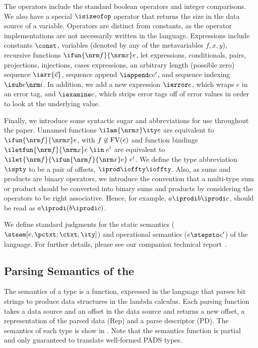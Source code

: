 The operators include the standard boolean operators and integer
comparisons. We also have a special $\isizeofop$ operator that returns
the size in the data source of a variable. Operators are distinct from
constants, as the operator implementations are not necessarily written
in the \implang language.  Expressions include constants $\const$,
variables (denoted by any of the metavariables $f,x,y$), recursive
functions $\ifun {\nrm f} {\nrm x} e$, let expressions, conditionals,
pairs, projections, injections, cases expressions, an arbitrary length
(possible zero) sequence $\iarr{\vec e}$, sequence append $\iappend e
{e'}$, and sequence indexing $\isub e {\nrm i}$. In addition, we add a
new expression $\ierror e$, which wraps $e$ in an error tag, and
$\iexamine e$, which strips error tags off of error values in order to
look at the underlying value.

Finally, we introduce some syntactic sugar and abbreviations for use
throughout the paper. Unnamed functions $\ilam {\nrm x} \ity e$ are
equivalent to $\ifun {\nrm f} {\nrm x} e$, with $f \not\in {\rm
  FV}(e)$ and function bindings $\iletfun {\nrm f} {\nrm x} e \; \iin
\; e'$ are equivalent to $\ilet {\nrm f} {\ifun {\nrm f} {\nrm x} e}
\; e'$.  We define the type abbreviation $\ispty$ to be a pair of
offsets, $\iprod \ioffty \ioffty$. Also, as sums and products are
binary operators, we introduce the convention that a multi-type sum or
product should be converted into binary sums and products by
considering the operators to be right associative. Hence, for example,
$a \iprodi b \iprodi c$, should be read as $a \iprodi (b \iprodi c)$.

We define standard judgments for the static semantics
($\stsem[e,{\pctxt;\ctxt},\ity]$) and operational semantics ($e
\stepsto e'$) of the \implang{} language. For further details, please
see our companion technical report~\cite{fisher+:pads-semantics-ext}.

\subsection{Parsing Semantics of the \ddc{}}
\label{sec:parse-sem}

The semantics of a type is a function, expressed in the \implang
language that parses bit strings to produce data structures in the
lambda calculus.  Each parsing function takes a data source and an
offset in the data source and returns a new offset, a representation
of the parsed data (Rep) and a parse descriptor (PD). The semantics of
each type is show in . Note that the semantics
function is partial and only guaranteed to translate well-formed PADS
types.

